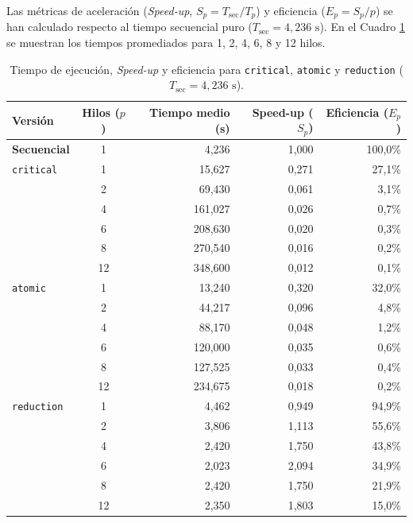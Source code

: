 \documentclass[12pt]{article}
\begin{document}
\begin{enumerate}
Las métricas de aceleración (\textit{Speed-up}, $S_p = T_{\text{sec}}/T_p$) y eficiencia ($E_p = S_p/p$) se han calculado respecto al tiempo secuencial puro ($T_{\text{sec}} = 4,236\text{ s}$). En el Cuadro \ref{tab:tiempos_cuestion3} se muestran los tiempos promediados para 1, 2, 4, 6, 8 y 12 hilos.
\begin{table}[htbp]
    \centering
    \small
    \begin{tabular}{lcrrr}
        \toprule
        \textbf{Versión} & \textbf{Hilos ($p$)} & \textbf{Tiempo medio (s)} & \textbf{Speed-up ($S_p$)} & \textbf{Eficiencia ($E_p$)} \\
        \midrule
        \textbf{Secuencial} & 1 & 4,236 & 1,000 & 100,0\% \\
        \midrule
        \texttt{critical}
        & 1  & 15,627  & 0,271 & 27,1\% \\
        & 2  & 69,430  & 0,061 & 3,1\% \\
        & 4  & 161,027 & 0,026 & 0,7\% \\
        & 6  & 208,630 & 0,020 & 0,3\% \\
        & 8  & 270,540 & 0,016 & 0,2\% \\
        & 12 & 348,600 & 0,012 & 0,1\% \\
        \midrule
        \texttt{atomic}
        & 1  & 13,240  & 0,320 & 32,0\% \\
        & 2  & 44,217  & 0,096 & 4,8\% \\
        & 4  & 88,170  & 0,048 & 1,2\% \\
        & 6  & 120,000 & 0,035 & 0,6\% \\
        & 8  & 127,525 & 0,033 & 0,4\% \\
        & 12 & 234,675 & 0,018 & 0,2\% \\
        \midrule
        \texttt{reduction}
        & 1  & 4,462   & 0,949 & 94,9\% \\
        & 2  & 3,806   & 1,113 & 55,6\% \\
        & 4  & 2,420   & 1,750 & 43,8\% \\
        & 6  & 2,023   & 2,094 & 34,9\% \\
        & 8  & 2,420   & 1,750 & 21,9\% \\
        & 12 & 2,350   & 1,803 & 15,0\% \\
        \bottomrule
    \end{tabular}
    \caption{Tiempo de ejecución, \textit{Speed-up} y eficiencia para \texttt{critical}, \texttt{atomic} y \texttt{reduction} ($T_{\text{sec}} = 4,236\text{ s}$).}
    \label{tab:tiempos_cuestion3}
\end{table}

\end{enumerate}
\end{document}

